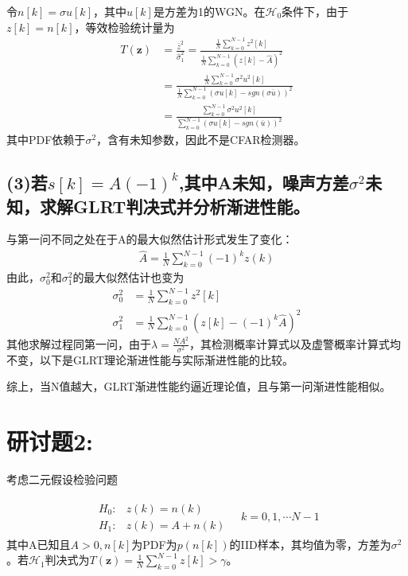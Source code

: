 \documentclass[fontset=windows]{article}
\numberwithin{figure}{section}
\begin{document}
令\(n[k]=\sigma u[k]\)，其中\(u[k]\)是方差为1的WGN。在\(\mathcal{H}_0\)条件下，由于\(z[k]=n[k]\)，等效检验统计量为
\begin{align*}
    T(\mathbf{z})
     & =\frac{\overline{z}^2}{\hat{\sigma}^2_1}
    =\frac{\frac{1}{N}\sum_{k=0}^{N-1}z^2[k]}{\frac{1}{N}\sum_{k=0}^{N-1}(z[k]-\hat{A})^2}       \\
     & =\frac{\frac{1}{N}\sum_{k=0}^{N-1}\sigma^2u^2[k]}
    {\frac{1}{N}\sum_{k=0}^{N-1}(\sigma u[k]-sgn(\sigma \overline{u}))^2}                        \\
     & =\frac{\sum_{k=0}^{N-1}\sigma^2u^2[k]}{\sum_{k=0}^{N-1}(\sigma u[k]-sgn(\overline{u}))^2}
\end{align*}
其中PDF依赖于\(\sigma^2\)，含有未知参数，因此不是CFAR检测器。

\subsection*{(3)若\(s[k]=A(-1)^k\),其中A未知，噪声方差\(\sigma^2\)未知，求解GLRT判决式并分析渐进性能。}

与第一问不同之处在于A的最大似然估计形式发生了变化：
\begin{align*}
    \hat{A}=\frac{1}{N}\sum_{k=0}^{N-1}(-1)^kz(k)
\end{align*}
由此，\(\sigma^2_0\)和\(\sigma^2_1\)的最大似然估计也变为
\begin{align*}
    \sigma^2_0 & =\frac{1}{N}\sum_{k=0}^{N-1}z^2[k]                 \\
    \sigma^2_1 & =\frac{1}{N}\sum_{k=0}^{N-1}(z[k]-(-1)^k\hat{A})^2
\end{align*}
其他求解过程同第一问，由于\(\lambda=\frac{NA^2}{\sigma^2}\)，其检测概率计算式以及虚警概率计算式均不变，以下是GLRT理论渐进性能与实际渐进性能的比较。


综上，当N值越大，GLRT渐进性能约逼近理论值，且与第一问渐进性能相似。

\section{研讨题2:}
考虑二元假设检验问题

\begin{align*}
    \begin{matrix}
        H_0: & z(k)=n(k)   \\
        H_1: & z(k)=A+n(k)
    \end{matrix}\quad k=0,1,\cdots N-1
\end{align*}
其中A已知且\(A>0,n[k]\)为PDF为\(p(n[k])\)的IID样本，其均值为零，方差为\(\sigma^2\)。若\(\mathcal{H}_1\)判决式为\(T(\mathbf{z})=\frac{1}{N}\sum_{k=0}^{N-1}z[k]>\gamma\)。
\end{document}
